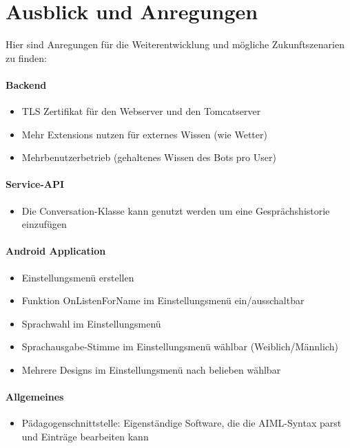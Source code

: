 \section{Ausblick und Anregungen}
	Hier sind Anregungen für die Weiterentwicklung und mögliche Zukunftszenarien zu finden:	
	\paragraph{Backend}
		\begin{itemize}\itemsep0pt
			\item{TLS Zertifikat für den Webserver und den Tomcatserver}
			\item{Mehr Extensions nutzen für externes Wissen (wie Wetter)}
			\item{Mehrbenutzerbetrieb (gehaltenes Wissen des Bots pro User)}
		\end{itemize}
		
	\paragraph{Service-API}
		\begin{itemize}\itemsep0pt
			\item{Die Conversation-Klasse kann genutzt werden um eine Gesprächshistorie einzufügen}
		\end{itemize}
		
	\paragraph{Android Application}
		\begin{itemize}\itemsep0pt
			\item{Einstellungsmenü erstellen}
			\item{Funktion OnListenForName im Einstellungsmenü ein/ausschaltbar}
			\item{Sprachwahl im Einstellungsmenü}
			\item{Sprachausgabe-Stimme im Einstellungsmenü wählbar (Weiblich/Männlich)}
			\item{Mehrere Designs im Einstellungsmenü nach belieben wählbar}
		\end{itemize}
		
	\paragraph{Allgemeines}
	\begin{itemize}\itemsep0pt
		\item{Pädagogenschnittstelle: Eigenständige Software, die die AIML-Syntax parst und Einträge bearbeiten kann}
	\end{itemize}